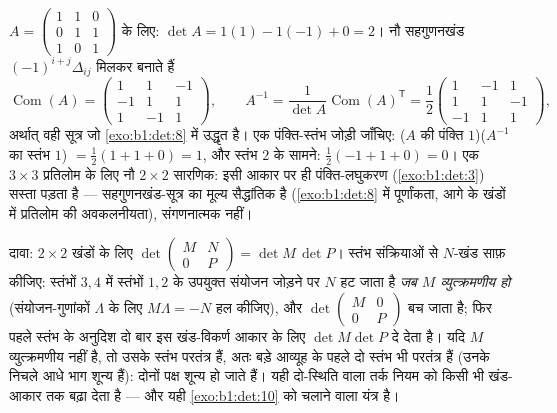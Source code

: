 \begin{example}
\label{ex:b1:det:cofactorinverse}
$A = \begin{pmatrix} 1 & 1 & 0\\ 0 & 1 & 1\\ 1 & 0 & 1\end{pmatrix}$ के लिए:
$\det A = 1(1) - 1(-1) + 0 = 2$। नौ सहगुणनखंड $(-1)^{i+j}\Delta_{ij}$ मिलकर
बनाते हैं
\[
\operatorname{Com}(A) = \begin{pmatrix}
1 & 1 & -1\\
-1 & 1 & 1\\
1 & -1 & 1
\end{pmatrix},
\qquad
A^{-1} = \frac{1}{\det A}\operatorname{Com}(A)^{\mathsf T}
= \frac12\begin{pmatrix}
1 & -1 & 1\\
1 & 1 & -1\\
-1 & 1 & 1
\end{pmatrix},
\]
अर्थात् वही सूत्र जो \cref{exo:b1:det:8} में उद्धृत है। एक पंक्ति-स्तंभ
जोड़ी जाँचिए: ($A$ की पंक्ति $1$)($A^{-1}$ का स्तंभ $1$) $= \frac12(1 + 1 +
0) = 1$, और स्तंभ $2$ के सामने: $\frac12(-1 + 1 + 0) = 0$। एक $3\times3$
प्रतिलोम के लिए नौ $2\times2$ सारणिक: इसी आकार पर ही पंक्ति-लघुकरण
(\cref{exo:b1:det:3}) सस्ता पड़ता है --- सहगुणनखंड-सूत्र का मूल्य सैद्धांतिक
है (\cref{exo:b1:det:8} में पूर्णांकता, आगे के खंडों में प्रतिलोम की
अवकलनीयता), संगणनात्मक नहीं।
\end{example}

\begin{example}[खंड-त्रिभुजाकार नियम, आकार $4$ में]
\label{ex:b1:det:blocktriangular}
दावा: $2\times2$ खंडों के लिए $\det\begin{pmatrix} M & N\\ 0 &
P\end{pmatrix} = \det M\,\det P$। स्तंभ संक्रियाओं से $N$-खंड साफ़ कीजिए:
स्तंभों $3, 4$ में स्तंभों $1, 2$ के उपयुक्त संयोजन जोड़ने पर $N$ हट जाता है
\emph{जब $M$ व्युत्क्रमणीय हो} (संयोजन-गुणांकों $\Lambda$ के लिए $M\Lambda =
-N$ हल कीजिए), और $\det\begin{pmatrix} M & 0\\ 0 & P\end{pmatrix}$ बच जाता
है; फिर पहले स्तंभ के अनुदिश दो बार  इस खंड-विकर्ण आकार के
लिए $\det M\det P$ दे देता है। यदि $M$ व्युत्क्रमणीय नहीं है, तो उसके स्तंभ
परतंत्र हैं, अतः बड़े आव्यूह के पहले दो स्तंभ भी परतंत्र हैं (उनके निचले आधे
भाग शून्य हैं): दोनों पक्ष शून्य हो जाते हैं। यही दो-स्थिति वाला तर्क नियम
को किसी भी खंड-आकार तक बढ़ा देता है --- और यही \cref{exo:b1:det:10} को चलाने
वाला यंत्र है।
\end{example}


